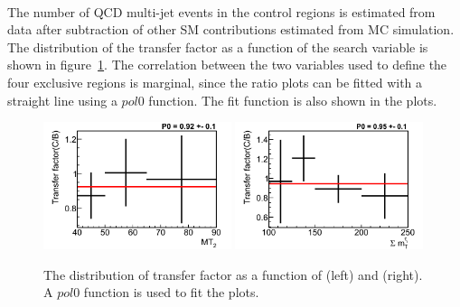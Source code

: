 \\The number of QCD multi-jet events in the control regions is estimated from data after subtraction 
of other SM contributions estimated from MC simulation. The distribution of the transfer factor as a 
function of the search variable is shown in figure~\ref{fig:1QCDbg}. The correlation 
between the two variables used to define the four exclusive regions is marginal, since the ratio plots can be fitted with a straight line using a $pol0$ function. The fit function is also shown in the plots.\\ 
\begin{figure}[!Hhtb]
\centering
\includegraphics[width=0.49\textwidth]{QCDbginTauTau/Bin1_transferfactor.png}
\includegraphics[width=0.49\textwidth]{QCDbginTauTau/Bin2_transferfactor.png} \\
\caption{The distribution of transfer factor as a function of \mttwo (left) and \SumMT (right). A $pol0$ function is used to fit the plots.}
\label{fig:1QCDbg}
\end{figure}

